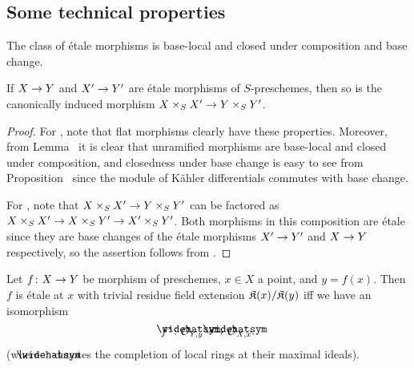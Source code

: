 \documentclass[a4paper,parskip=half,numbers=enddot, DIV=12]{scrreprt}
\begin{document}
\subsection{Some technical properties}
\begin{lem}
	\begin{alphanumerate}
		\item {}The class of étale morphisms is base-local and closed under composition and base change.
		\item If $X\morphism Y$ and $X'\morphism Y'$ are étale morphisms of $S$-preschemes, then so is the canonically induced morphism $X\times_SX'\morphism Y\times_SY'$.
	\end{alphanumerate}
\end{lem}
\begin{proof}
	For , note that flat morphisms clearly have these properties. Moreover, from Lemma~ it is clear that unramified morphisms are base-local and closed under composition, and closedness under base change is easy to see from Proposition~ since the module of Kähler differentials commutes with base change.
	
	For , note that $X\times_SX'\morphism Y\times_SY'$ can be factored as $X\times_SX'\morphism X\times_SY'\morphism X'\times_SY'$. Both morphisms in this composition are étale since they are base changes of the étale morphisms $X'\morphism Y'$ and $X\morphism Y$ respectively, so the assertion follows from .
\end{proof}
\begin{lem}
	Let $f\colon X\morphism Y$ be morphism of preschemes, $x\in X$ a point, and $y=f(x)$. Then $f$ is étale at $x$ with trivial residue field extension $\mathfrak{K}(x)/\mathfrak{K}(y)$ iff we have an isomorphism
	\begin{align*}
		f^*\colon \roof{\Oo}_{Y,y}\isomorphism \roof{\Oo}_{X,x}.
	\end{align*}
	(where $\roof{\phantom{x}}$ denotes the completion of local rings at their maximal ideals).
\end{lem}
\end{document}
